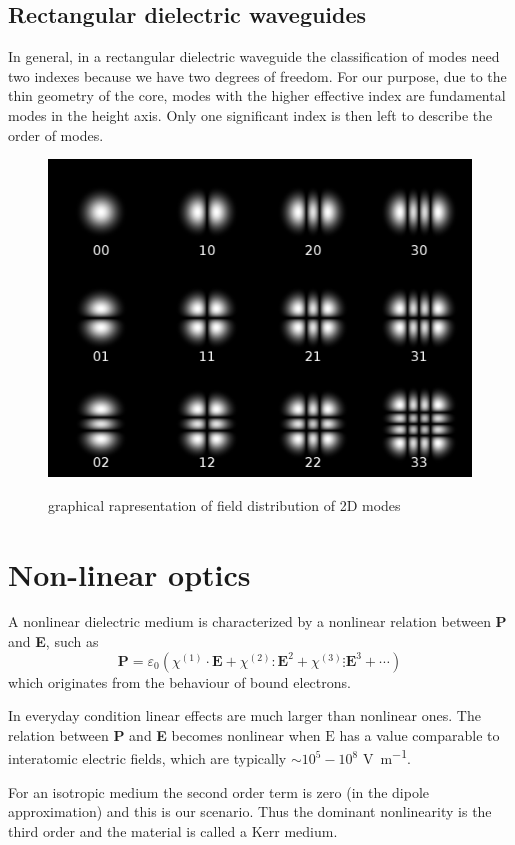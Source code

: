 \documentclass[12pt,a4paper,twoside]{article}
\begin{document}
\subsection{Rectangular dielectric waveguides}
In general, in a rectangular dielectric waveguide the classification of modes need two indexes because we have two degrees of freedom.
For our purpose, due to the thin geometry of the core, modes with the higher effective index are fundamental modes in the height axis.
Only one significant index is then left to describe the order of modes.

\begin{figure}[ht]
	\centering
	\includegraphics[width=.5\textwidth]{2Dmodes.png}
	\label{fig_2dmodes}
	\caption{graphical rapresentation of field distribution of 2D modes}
\end{figure}

\section{Non-linear optics}
A nonlinear dielectric medium is characterized by a nonlinear relation between \textbf{P} and \textbf{E}, such as
\begin{equation}
\textbf{P} = \varepsilon_0 \left( \chi^{(1)} \cdot \textbf{E} + \chi^{(2)} : \textbf{E}^2 + \chi^{(3)} \vdots \textbf{E}^3 + \cdots \right)
\end{equation}
which originates from the behaviour of bound electrons.

In everyday condition linear effects are much larger than nonlinear ones.
The relation between \textbf{P} and \textbf{E} becomes nonlinear when $\mathrm{E}$ has a value comparable to interatomic electric fields, which are typically $\sim 10^5-10^8$ \si{\V\per\m}.

For an isotropic medium the second order term is zero (in the dipole approximation) and this is our scenario.
Thus the dominant nonlinearity is the third order and the material is called a Kerr medium.
\end{document}
